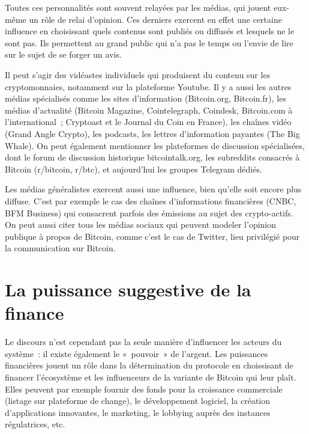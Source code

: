 Toutes ces personnalités sont souvent relayées par les médias, qui jouent eux-même un rôle de relai d'opinion. Ces derniers exercent en effet une certaine influence en choisissant quels contenus sont publiés ou diffusés et lesquels ne le sont pas. Ils permettent au grand public qui n'a pas le temps ou l'envie de lire sur le sujet de se forger un avis.

Il peut s'agir des vidéastes individuels qui produisent du contenu sur les cryptomonnaies, notamment sur la plateforme Youtube. Il y a aussi les autres médias spécialisés comme les sites d'information (Bitcoin.org, Bitcoin.fr), les médias d'actualité (Bitcoin Magazine, Cointelegraph, Coindesk, Bitcoin.com à l'international~; Cryptoast et le Journal du Coin en France), les chaînes vidéo (Grand Angle Crypto), les podcasts, les lettres d'information payantes (The Big Whale). On peut également mentionner les plateformes de discussion spécialisées, dont le forum de discussion historique bitcointalk.org, les subreddits consacrés à Bitcoin (r/bitcoin, r/btc), et aujourd'hui les groupes Telegram dédiés.

Les médias généralistes exercent aussi une influence, bien qu'elle soit encore plus diffuse. C'est par exemple le cas des chaînes d'informations financières (CNBC, BFM Business) qui consacrent parfois des émissions au sujet des crypto-actifs. On peut aussi citer tous les médias sociaux qui peuvent modeler l'opinion publique à propos de Bitcoin, comme c'est le cas de Twitter, lieu privilégié pour la communication sur Bitcoin.

\section*{La puissance suggestive de la finance} %

Le discours n'est cependant pas la seule manière d'influencer les acteurs du système~: il existe également le «~pouvoir~» de l'argent. Les puissances financières jouent un rôle dans la détermination du protocole en choissisant de financer l'écosystème et les influenceurs de la variante de Bitcoin qui leur plaît. Elles peuvent par exemple fournir des fonds pour la croissance commerciale (listage sur plateforme de change), le développement logiciel, la création d'applications innovantes, le marketing, le lobbying auprès des instances régulatrices, etc.

